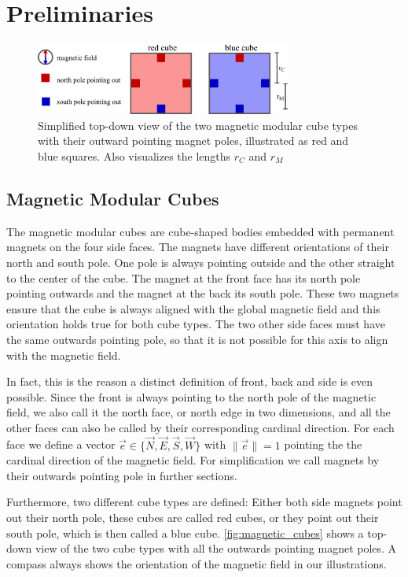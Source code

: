 \chapter{Preliminaries}
\label{chap:prelim}

\begin{figure}
	\centering
	\includegraphics[width=0.75\textwidth]{figures/magnetic_cubes.pdf}
	\caption[Top-down view of the two magnetic modular cube types]{Simplified top-down view of the two magnetic modular cube types with their outward pointing magnet poles, illustrated as red and blue squares. Also visualizes the lengths $r_C$ and $r_M$}
	\label{fig:magnetic_cubes}
\end{figure}

\section{Magnetic Modular Cubes}
The magnetic modular cubes are cube-shaped bodies embedded with permanent magnets on the four side faces.
The magnets have different orientations of their north and south pole. 
One pole is always pointing outside and the other straight to the center of the cube.
The magnet at the front face has its north pole pointing outwards and the magnet at the back its south pole.
These two magnets ensure that the cube is always aligned with the global magnetic field and this orientation holds true for both cube types.
The two other side faces must have the same outwards pointing pole, so that it is not possible for this axis to align with the magnetic field.

In fact, this is the reason a distinct definition of front, back and side is even possible.
Since the front is always pointing to the north pole of the magnetic field, we also call it the north face, or north edge in two dimensions, and all the other faces can also be called by their corresponding cardinal direction.
For each face we define a vector $\vec{e} \in \{ \vec{N},\vec{E},\vec{S},\vec{W}\}$ with $\lVert \vec{e} \rVert = 1$ pointing the the cardinal direction of the magnetic field.
For simplification we call magnets by their outwards pointing pole in further sections.

Furthermore, two different cube types are defined:
Either both side magnets point out their north pole, these cubes are called red cubes, or they point out their south pole, which is then called a blue cube.
\autoref{fig:magnetic_cubes} shows a top-down view of the two cube types with all the outwards pointing magnet poles.
A compass always shows the orientation of the magnetic field in our illustrations.

